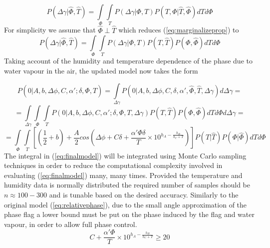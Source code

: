 \begin{equation}
P(\Delta\gamma|\hat{\Phi},\hat{T})= \int \limits_\Phi \int \limits_T P(\Delta\gamma|\Phi,T)P(T,\Phi|\hat{T},\hat{\Phi})dTd\Phi
\label{eq:marginalizeprop}
\end{equation}  
For simplicity we assume that $\hat{\Phi}\perp\hat{T}$ which reduces 
(\ref{eq:marginalizeprop}) to 
\begin{equation}
P(\Delta\gamma|\hat{\Phi},\hat{T})= \int \limits_\Phi \int \limits_T P(\Delta\gamma|\Phi,T)P(T,\hat{T})P(\Phi,\hat{\Phi})dTd\Phi
\label{eq:marginalizeprop2}
\end{equation}
Taking account of the humidity and temperature dependence of the phase due to water vapour in the air, the updated model now takes the form 

\begin{equation*}
  P(0|A,b,\Delta\phi,C,\alpha';\delta,\hat{\Phi},\hat{T}) = \int \limits_{\Delta\gamma} P(0|A,b,\Delta\phi,C,\delta,\alpha',\hat{\Phi},\hat{T},\Delta\gamma)d\Delta\gamma =
\end{equation*}
\begin{equation*}
= \int \limits_{\Delta\gamma} \int \limits_\Phi \int \limits_T P(0|A,b,\Delta\phi,C,\alpha';\delta,\Phi,T,\Delta\gamma)P(T,\hat{T})P(\Phi,\hat{\Phi})dTd\Phi d\Delta\gamma =
\end{equation*}
\small
\begin{equation}
= \int \limits_\Phi \int \limits_T \left[(\frac{1}{2}+b)+\frac{A}{2}cos\left(\Delta\phi + C\delta + \frac{\alpha' \Phi\delta}{T}\times 10^{h_A - \frac{h_B}{h_C + T}}\right)\right]P(T|\hat{T})P(\Phi|\hat{\Phi})dTd\Phi
\label{eq:finalmodel}
\end{equation}
\normalsize
The integral in (\ref{eq:finalmodel}) will be integrated using Monte Carlo sampling techniques in order to reduce the computational complexity involved in evaluating (\ref{eq:finalmodel}) many, many times. Provided the temperature and humidity data is normally distributed the required number of samples should be $n\approx100-300$ and is tunable based on the desired accuracy. Similarly to the original model (\ref{eq:relativephase}), due to the small angle approximation of the phase flag a lower bound must be put on the phase induced by the flag and water vapour, in order to allow full phase control. 
\begin{equation}
C+\frac{\alpha'\Phi}{T}\times 10^{h_A - \frac{h_B}{h_C + T}} \geq 20
\label{eq:fullphasecontrol}
\end{equation}

